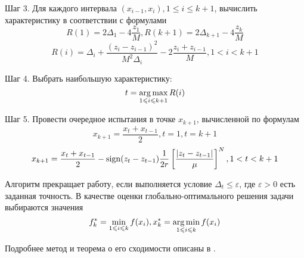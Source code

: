 \par
Шаг 3. Для каждого интервала \((x_{i-1},x_i),1\leqslant i\leqslant k+1\), вычислить характеристику в соответствии с формулами
\begin{equation}
\label{step3_1}
R(1)=2\Delta_1-4\dfrac{z_1}{M},R(k+1)=2\Delta_{k+1}-4\dfrac{z_k}{M}
\end{equation}
\begin{equation}
\label{step3_2}
R(i)=\Delta_i+\dfrac{(z_i-z_{i-1})^2}{M^2\Delta_i}-2\dfrac{z_i+z_{i-1}}{M},1<i<k+1
\end{equation}
\par
Шаг 4. Выбрать наибольшую характеристику:
\begin{equation}
\label{step4}
t=\operatorname*{arg\,max}_{1\leqslant i \leqslant k+1}R(i)
\end{equation}
\par
Шаг 5. Провести очередное испытания в точке \(x_{k+1}\), вычисленной по формулам
\begin{displaymath}
x_{k+1}=\dfrac{x_{t}+x_{t-1}}{2},t=1,t=k+1
\end{displaymath}
\begin{equation}
\label{step5}
x_{k+1}=\dfrac{x_{t}+x_{t-1}}{2}-\operatorname{sign}(z_{t}-z_{t-1})\dfrac{1}{2r}\left[\dfrac{|z_{t}-z_{t-1}|}{\mu}\right]^N,1<t<k+1
\end{equation}
\par
Алгоритм прекращает работу, если выполняется условие \(\Delta_{t}\leqslant \varepsilon\), где \(\varepsilon>0\) есть заданная точность. В качестве оценки глобально-оптимального решения задачи  выбираются значения
\begin{equation}
f_k^*=\min_{1\leqslant i \leqslant k}f(x_i), x_k^*=\operatorname*{arg\,min}_{1\leqslant i \leqslant k}f(x_i)
\end{equation}
\par
Подробнее метод и теорема о его сходимости описаны в \cite{strOptBook}.
